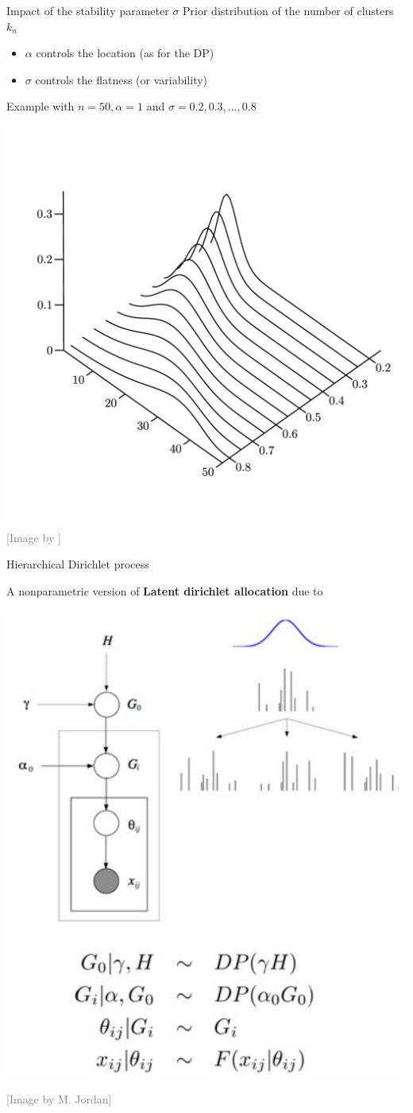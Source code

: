 {Impact of the stability parameter $\sigma$}
Prior distribution of the number of clusters $k_n$ 
\begin{itemize}
\item \textcolor{red2}{$\alpha$ controls the location} (as for the DP)
\item \textcolor{red2}{$\sigma$ controls the flatness (or variability)}
\end{itemize}

Example with $n=50, \alpha=1$ and \textcolor{red2}{$\sigma=0.2,0.3,\ldots, 0.8$}

\begin{center}
\includegraphics[width=.7\textwidth]{figures_julyan/introRPM/prior_K_n_PY.pdf}\\
	\hfill\textcolor{gray}{[Image by \citet{deblasi2015gibbs}]}
\end{center}



{Hierarchical Dirichlet process}

A nonparametric version of \textbf{Latent dirichlet allocation} \citep{blei2003latent} due to  \citet{teh2006hierarchical}\\
\begin{center}
		\includegraphics[width=.5\textwidth]{figures_julyan/beyond_DP/HDP}
\end{center}
\hfill\textcolor{gray}{[Image by M. Jordan]}

